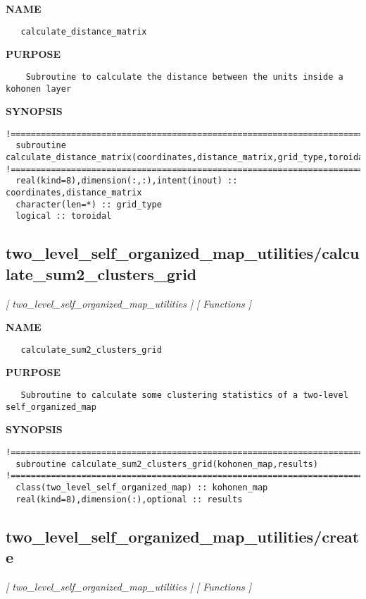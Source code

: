 \documentclass{article}
\begin{document}
\label{ch:robo64}
\label{ch:two_level_self_organized_map_utilities_calculate_distance_matrix}
\textbf{NAME}
\begin{verbatim}
   calculate_distance_matrix
\end{verbatim}
\textbf{PURPOSE}
\begin{verbatim}
    Subroutine to calculate the distance between the units inside a kohonen layer 
\end{verbatim}
\textbf{SYNOPSIS}
\begin{verbatim}
!========================================================================================
  subroutine calculate_distance_matrix(coordinates,distance_matrix,grid_type,toroidal)
!========================================================================================
  real(kind=8),dimension(:,:),intent(inout) :: coordinates,distance_matrix
  character(len=*) :: grid_type
  logical :: toroidal
\end{verbatim}
\newpage
\subsection{two\_level\_self\_organized\_map\_utilities/calculate\_sum2\_clusters\_grid}
\textsl{[ two\_level\_self\_organized\_map\_utilities ]}
\textsl{[ Functions ]}

\label{ch:robo65}
\label{ch:two_level_self_organized_map_utilities_calculate_sum2_clusters_grid}
\textbf{NAME}
\begin{verbatim}
   calculate_sum2_clusters_grid
\end{verbatim}
\textbf{PURPOSE}
\begin{verbatim}
   Subroutine to calculate some clustering statistics of a two-level self_organized_map 
\end{verbatim}
\textbf{SYNOPSIS}
\begin{verbatim}
!========================================================================================
  subroutine calculate_sum2_clusters_grid(kohonen_map,results)
!========================================================================================
  class(two_level_self_organized_map) :: kohonen_map
  real(kind=8),dimension(:),optional :: results
\end{verbatim}
\newpage
\subsection{two\_level\_self\_organized\_map\_utilities/create}
\textsl{[ two\_level\_self\_organized\_map\_utilities ]}
\textsl{[ Functions ]}
\end{document}
